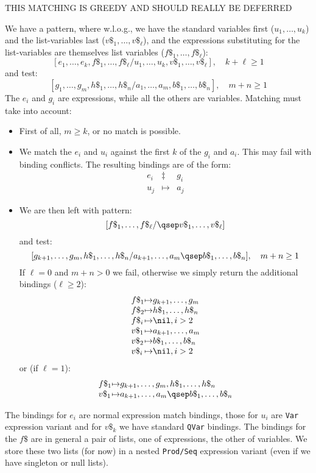 THIS MATCHING IS GREEDY AND SHOULD REALLY BE DEFERRED

We have a pattern, where w.l.o.g., we have the standard variables first
($u_1,\ldots,u_k$) and the list-variables last ($ v\$_1,\ldots,v\$_\ell$),
and the expressions substituting for the list-variables are themselves
list variables ($f\$_1,\ldots,f\$_\ell$):
$$
 [ e_1,\ldots,e_k , f\$_1,\ldots,f\$_\ell
 /
   u_1,\ldots,u_k ,  v\$_1,\ldots,v\$_\ell ]
 , \quad k+\ell \geq 1
$$
and test:
$$
 [ g_1,\ldots,g_m , h\$_1,\ldots,h\$_n
 /
   a_1,\ldots,a_m ,  b\$_1,\ldots,b\$_n ]
 , \quad m+n \geq 1
$$
The $e_i$ and $g_i$ are expressions,
while all the others are variables.
Matching must take into account:
\begin{itemize}
  \item First of all, $m \geq k$, or no match is possible.
  \item We match the $e_i$ and $u_i$
        against the first $k$ of the $g_i$ and $a_i$.
        This may fail with binding conflicts.
        The resulting bindings are of the form:
        $$
          \begin{array}{ccc}
             e_i & \ddagger & g_i
          \\ u_j & \mapsto & a_j
          \end{array}
        $$
  \item We are then left with pattern:
        $$
        [  f\$_1,\ldots,f\$_\ell
        /
         \qsep  v\$_1,\ldots,v\$_\ell ]
        $$
        and test:
        $$
         [ g_{k+1},\ldots,g_m , h\$_1,\ldots,h\$_n
         /
         a_{k+1},\ldots,a_m \qsep  b\$_1,\ldots,b\$_n ]
         , \quad m+n \geq 1
        $$
        If $\ell=0$ and $m+n > 0$ we fail,
        otherwise we simply return the additional bindings ($\ell\geq 2$):
        $$
         \begin{array}{l@{\mapsto}l}
            f\$_1 & g_{k+1},\ldots,g_m
         \\ f\$_2 & h\$_1,\ldots,h\$_n
         \\ f\$_i & \nil, i > 2
         \\ v\$_1 & a_{k+1},\ldots,a_m
         \\ v\$_2 & b\$_1,\ldots,b\$_n
         \\ v\$_i & \nil, i > 2
         \end{array}
        $$
        or (if $\ell =1$):
        $$
         \begin{array}{l@{\mapsto}l}
            f\$_1 & g_{k+1},\ldots,g_m ,  h\$_1,\ldots,h\$_n
         \\ v\$_1 & a_{k+1},\ldots,a_m \qsep  b\$_1,\ldots,b\$_n
         \end{array}
        $$
\end{itemize}
The bindings for $e_i$ are normal expression match bindings,
those for $u_i$ are \texttt{Var} expression variant
and for $v\$_k$ we have standard \texttt{QVar} bindings.
The bindings for the $f\$$ are in general a pair of lists,
one of expressions, the other of variables.
We store these two lists (for now) in a nested  \texttt{\texttt{Prod}/\texttt{Seq}} expression variant
(even if we have singleton or null lists).